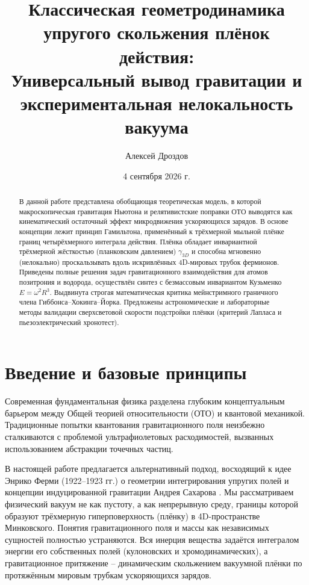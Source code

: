 \documentclass[12pt,a4paper]{article}
\begin{document}
\title{Классическая геометродинамика упругого скольжения плёнок действия:\\Универсальный вывод гравитации и экспериментальная нелокальность вакуума}

\author{Алексей Дроздов}  

\date{4 сентября 2026 г.}

\begin{abstract}  
В данной работе представлена обобщающая теоретическая модель, в которой макроскопическая гравитация Ньютона и релятивистские поправки ОТО выводятся как кинематический остаточный эффект микродвижения ускоряющихся зарядов. В основе концепции лежит принцип Гамильтона, применённый к трёхмерной мыльной плёнке границ четырёхмерного интеграла действия. Плёнка обладает инвариантной трёхмерной жёсткостью (планковским давлением) $\gamma_{3D}$ и способна мгновенно (нелокально) проскальзывать вдоль искривлённых 4D-мировых трубок фермионов. Приведены полные решения задач гравитационного взаимодействия для атомов позитрония и водорода, осуществлён синтез с безмассовым инвариантом Кузьменко $E = \omega^2 R^3$. Выдвинута строгая математическая критика мейнстримного граничного члена Гиббонса--Хокинга--Йорка. Предложены астрономические и лабораторные методы валидации сверхсветовой скорости подстройки плёнки (критерий Лапласа и пьезоэлектрический хронотест).  
\end{abstract}

\maketitle

\section{Введение и базовые принципы}  
Современная фундаментальная физика разделена глубоким концептуальным барьером между Общей теорией относительности (ОТО) и квантовой механикой. Традиционные попытки квантования гравитационного поля неизбежно сталкиваются с проблемой ультрафиолетовых расходимостей, вызванных использованием абстракции точечных частиц.

В настоящей работе предлагается альтернативный подход, восходящий к идее Энрико Ферми (1922--1923 гг.) о геометрии интегрирования упругих полей \cite{Fermi1923} и концепции индуцированной гравитации Андрея Сахарова \cite{Sakharov1967}. Мы рассматриваем физический вакуум не как пустоту, а как непрерывную среду, границы которой образуют трёхмерную гиперповерхность (плёнку) в 4D-пространстве Минковского. Понятия гравитационного поля и массы как независимых сущностей полностью устраняются. Вся инерция вещества задаётся интегралом энергии его собственных полей (кулоновских и хромодинамических), а гравитационное притяжение \--- динамическим скольжением вакуумной плёнки по протяжённым мировым трубкам ускоряющихся зарядов.
\end{document}
